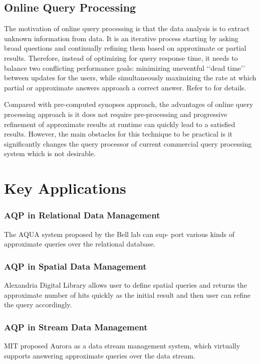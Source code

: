 \documentclass[twocolumn]{article}
\begin{document}
\subsection{Online Query Processing}
The motivation of online query processing is that the data analysis is to extract unknown information from data. It is an iterative process starting by asking broad questions and continually refining them based on approximate or partial results. Therefore, instead of optimizing for query response time, it needs to balance two conflicting performance goals: minimizing uneventful ‘‘dead time’’ between updates for the users, while simultaneously maximizing the rate at which partial or approximate answers approach a correct answer. Refer to \cite{Hellerstein:1997} for details.

Compared with pre-computed synopses approach, the advantages of online query processing approach is it does not require pre-processing and progressive refinement of approximate results at runtime can quickly lead to a satisfied results. However, the main obstacles for this technique to be practical is it significantly changes the query processor of current commercial query processing system which is not desirable.



\section{Key Applications}

\subsubsection*{AQP in Relational Data Management}
The AQUA system proposed by the Bell lab can sup- port various kinds of approximate queries over the relational database.

\subsubsection*{AQP in Spatial Data Management}
Alexandria Digital Library allows user to define spatial queries and returns the approximate number of hits quickly as the initial result and then user can refine the query accordingly.

\subsubsection*{AQP in Stream Data Management}
MIT proposed Aurora as a data stream management system, which virtually supports answering approximate queries over the data stream.
\end{document}
